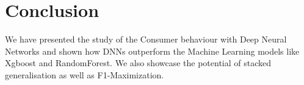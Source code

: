 \section{Conclusion}
We have presented the study of the Consumer behaviour with Deep Neural Networks and shown how
DNNs outperform the Machine Learning models like Xgboost and RandomForest. We also showcase the 
potential of stacked generalisation as well as F1-Maximization.
